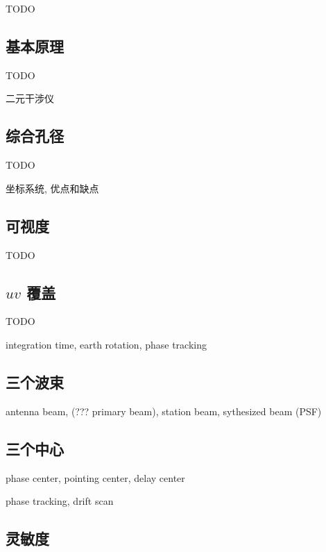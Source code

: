 TODO

\subsection{基本原理}

TODO

二元干涉仪

\subsection{综合孔径}

TODO

坐标系统, 优点和缺点

\subsection{可视度}

TODO

\subsection{$uv$ 覆盖}

TODO

integration time, earth rotation, phase tracking

\subsection{三个波束}

antenna beam, (??? primary beam), station beam, sythesized beam (PSF)

\subsection{三个中心}

phase center, pointing center, delay center

phase tracking, drift scan

\subsection{灵敏度}

